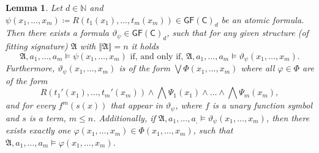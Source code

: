 \documentclass[a4paper,11pt,DIV=15]{scrartcl} %
\renewcommand{\phi}{\varphi}
\theoremstyle{plain}
\newtheorem{lemma}[theorem]{Lemma}
\theoremstyle{definition}
\newcommand{\GFC}{\mathsf{GF}(\mathsf{C})}
\renewcommand{\theta}{\vartheta}
\begin{document}
\begin{lemma}
	Let $d\in\mathbb N$ and $\psi(x_1,\dots,x_m)\coloneqq R(t_1(x_1),\dots,t_m(x_m))\in \GFC_d$ be an atomic formula.
	Then there exists a formula $\theta_\psi\in\GFC_d$, such that for any given structure (of fitting signature) $\mathfrak A$ with $\Vert\mathfrak A \Vert=n$ it holds
	$$\mathfrak A,a_1,\dots,a_m\models \psi(x_1,\dots,x_m) \text{ if, and only if, } \mathfrak A,a_1,\dots,a_m\models \theta_\psi(x_1,\dots,x_m).$$
	Furthermore, $\theta_\psi(x_1,\dots,x_m)$ is of the form $\bigvee \Phi(x_1,\dots,x_m)$ where all $\phi\in\Phi$ are of the form
	$$R(t_1'(x_1),\dots,t_m'(x_m))\land \bigwedge\Psi_1(x_1)\land \dots\land\bigwedge \Psi_m(x_m),$$
	and for every $f^m(s(x))$ that appear in $\theta_\psi$, where $f$ is a unary function symbol and $s$ is a term, $m\leq n$.
	Additionally, if $\mathfrak A,a_1,\dots,a_,\models \theta_\psi(x_1,\dots,x_m)$, then there exists exactly one $\phi(x_1,\dots,x_m)\in\Phi(x_1,\dots,x_m)$, such that $\mathfrak A,a_1,\dots,a_m\models \phi(x_1,\dots,x_m)$.
	\label{TranslationOfArbAtomics}
\end{lemma}
\end{document}
